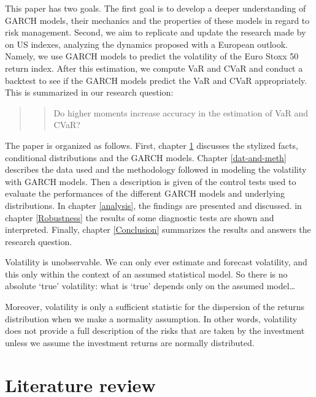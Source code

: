 \documentclass[a4paper, twoside]{templates/ociamthesis}
\begin{document}
\noindent This paper has two goals. The first goal is to develop a deeper understanding of GARCH models, their mechanics and the properties of these models in regard to risk management. Second, we aim to replicate and update the research made by \textcite{bali2008} on US indexes, analyzing the dynamics proposed with a European outlook. Namely, we use GARCH models to predict the volatility of the Euro Stoxx 50 return index. After this estimation, we compute VaR and CVaR and conduct a backtest to see if the GARCH models predict the VaR and CVaR appropriately. This is summarized in our research question:

\begin{quote}
\begin{quote}
Do higher moments increase accuracy in the estimation of VaR and CVaR?
\end{quote}
\end{quote}

\noindent The paper is organized as follows. First, chapter \ref{lit-rev} discusses the stylized facts, conditional distributions and the GARCH models. Chapter \ref{dat-and-meth} describes the data used and the methodology followed in modeling the volatility with GARCH models. Then a description is given of the control tests used to evaluate the performances of the different GARCH models and underlying distributions. In chapter \ref{analysis}, the findings are presented and discussed. in chapter \ref{Robustness} the results of some diagnostic tests are shown and interpreted. Finally, chapter \ref{Conclusion} summarizes the results and answers the research question.

\begin{savequote}
Volatility is unobservable. We can only ever estimate and forecast
volatility, and this only within the context of an assumed statistical
model. So there is no absolute `true' volatility: what is `true' depends
only on the assumed model\ldots{}

Moreover, volatility is only a sufficient statistic for the dispersion
of the returns distribution when we make a normality assumption. In
other words, volatility does not provide a full description of the risks
that are taken by the investment unless we assume the investment returns
are normally distributed.
\end{savequote}



\hypertarget{lit-rev}{%
\chapter{Literature review}\label{lit-rev}}
\end{document}
